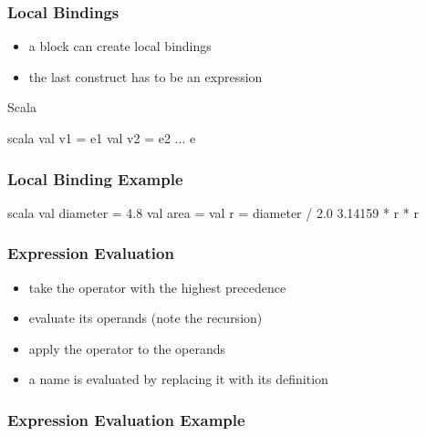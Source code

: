 \documentclass[dvipsnames]{beamer}
\theoremstyle{plain}
\begin{document}
\begin{frame}[fragile]
  \frametitle{Local Bindings}

  \begin{itemize}
    \item a block can create local bindings
    \item the last construct has to be an expression
  \end{itemize}

  \begin{block}{Scala}
    \begin{pygments}{scala}
{
    val v1 = e1
    val v2 = e2
    ...
    e
}
    \end{pygments}
  \end{block}
\end{frame}

\begin{frame}[fragile]
  \frametitle{Local Binding Example}

  \begin{example}[Scala]
    \begin{pygments}{scala}
val diameter = 4.8
val area = {
    val r = diameter / 2.0
    3.14159 * r * r
}
    \end{pygments}
  \end{example}
\end{frame}

\begin{frame}
  \frametitle{Expression Evaluation}

  \begin{itemize}
    \item take the operator with the highest precedence
    \item evaluate its operands (note the recursion)
    \item apply the operator to the operands

    \pause
    \medskip
    \item a name is evaluated by replacing it with its definition
  \end{itemize}
\end{frame}

\begin{frame}
  \frametitle{Expression Evaluation Example}

  \begin{example}

    \pause
    \medskip

    \pause
    \medskip

    \pause
    \medskip
  \end{example}
\end{frame}
\end{document}
